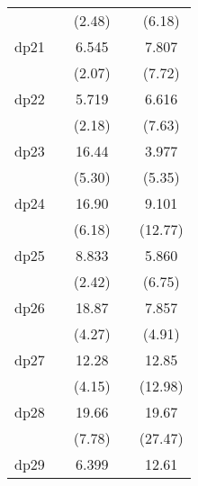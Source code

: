 {\begin{tabular}{l*{4}{c}}
            &                     &      (2.48)         &                     &      (6.18)         \\
[1em]
dp21        &                     &       6.545\sym{*}  &                     &       7.807\sym{***}\\
            &                     &      (2.07)         &                     &      (7.72)         \\
[1em]
dp22        &                     &       5.719\sym{*}  &                     &       6.616\sym{***}\\
            &                     &      (2.18)         &                     &      (7.63)         \\
[1em]
dp23        &                     &       16.44\sym{***}&                     &       3.977\sym{***}\\
            &                     &      (5.30)         &                     &      (5.35)         \\
[1em]
dp24        &                     &       16.90\sym{***}&                     &       9.101\sym{***}\\
            &                     &      (6.18)         &                     &     (12.77)         \\
[1em]
dp25        &                     &       8.833\sym{*}  &                     &       5.860\sym{***}\\
            &                     &      (2.42)         &                     &      (6.75)         \\
[1em]
dp26        &                     &       18.87\sym{***}&                     &       7.857\sym{***}\\
            &                     &      (4.27)         &                     &      (4.91)         \\
[1em]
dp27        &                     &       12.28\sym{***}&                     &       12.85\sym{***}\\
            &                     &      (4.15)         &                     &     (12.98)         \\
[1em]
dp28        &                     &       19.66\sym{***}&                     &       19.67\sym{***}\\
            &                     &      (7.78)         &                     &     (27.47)         \\
[1em]
dp29        &                     &       6.399\sym{*}  &                     &       12.61\sym{***}\\

\end{tabular}}
